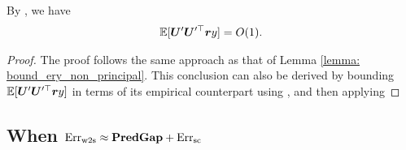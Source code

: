 \begin{lemma}\label{lemma: bound_ery_principal}
By \bounded{}, we have
\begin{align}
    \nonumber
    \mathbb{E}[ {\bm{U}}' {\bm{U}}'^\top {\bm{r}} y ]=O(1).
\end{align}
\end{lemma}
\begin{proof}
The proof follows the same approach as that of Lemma \ref{lemma: bound_ery_non_principal}. This conclusion can also be derived by bounding $\mathbb{E}[ {\bm{U}}' {\bm{U}}'^\top {\bm{r}} y ]$ in terms of its empirical counterpart using \conc{}, and then applying \bounded{}
\end{proof}

\subsection{When $\text{Err}_{\text{w2s}} \approx \textbf{PredGap}{} + \text{Err}_{\text{sc}}  $}

